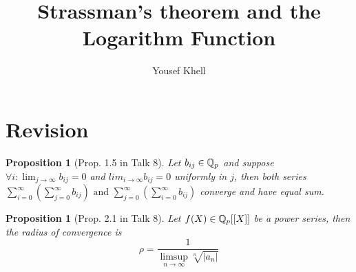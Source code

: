 \documentclass[a4paper]{article}
\title{\vspace{-2cm}Strassman's theorem and the Logarithm Function}
\author{Yousef Khell}
\theoremstyle{plain}
\newtheorem{prop}[thm]{Proposition}
\theoremstyle{definition}
\begin{document}
\section{Revision}
\begin{prop}[Prop. 1.5 in Talk 8]
  Let $b_{ij} \in \Bbb Q_{p}$ and suppose $\forall i: \lim_{j \to \infty}b_{ij} = 0$ and $lim_{i \to \infty}b_{ij} = 0$ uniformly in $j$, then both series
  $\sum_{i=0}^{\infty}\left(\sum_{j=0}^{\infty} b_{ij} \right) \text{ and } \sum_{j=0}^{\infty}\left(\sum_{i=0}^{\infty} b_{ij} \right)$
  converge and have equal sum.
\end{prop}
\begin{prop}[Prop. 2.1 in Talk 8]
  Let $f(X) \in \Bbb Q_{p}[[X]]$ be a power series, then the radius of convergence is
  $$\rho = \frac{1}{\displaystyle \limsup_{n \to \infty}\sqrt[n]{|a_{n}|}}$$
\end{prop}
\end{document}
